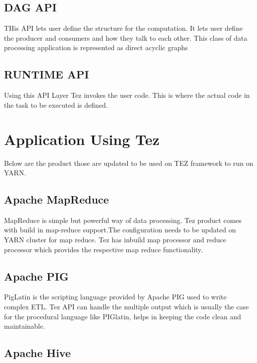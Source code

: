 \documentclass[9pt,twocolumn,twoside]{../../styles/osajnl}
\begin{document}
\subsection{ DAG API}
	THis API lets user define the structure for the computation.
	It lets user define the producer and consumers and how they talk to each other.
	This class of data processing application is represented as direct acyclic graphs 	

\subsection{RUNTIME API}
 	
	Using this API Layer Tez invokes the user code. This is where the actual code in the task  
to be executed is defined.


\section{Application Using Tez}
     Below are the product those are updated to be used on TEZ framework to run on YARN.
 
               
\subsection{Apache MapReduce}
      
    MapReduce is simple but powerful way of data processing. Tez product comes with
    build in map-reduce support.The configuration needs to be updated on YARN cluster
    for map reduce. Tez has inbuild map processor and reduce processor which provides the
    respective map reduce functionality.
               
 \subsection{Apache PIG}              
   PigLatin is the scripting language provided by Apache PIG used to write complex ETL.
   Tez API can handle the multiple output which is usually the case for the procedural language    like PIGlatin, helps in keeping the code clean and maintainable.
 
  \subsection{Apache Hive}
              
\end{document}
